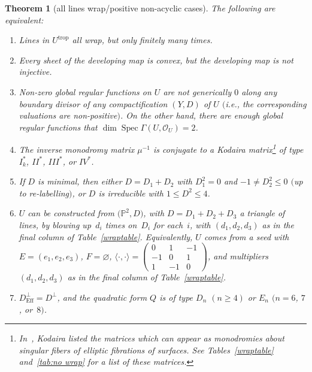 \documentclass[pdftex]{sigma}
\numberwithin{equation}{section}
\numberwithin{figure}{section}
\numberwithin{table}{section}
\DeclareMathOperator{\Spec}{Spec}
\DeclareMathOperator{\trop}{trop}
\DeclareMathOperator{\Eff}{Eff}
\let\bb=\mathbb
\let\s=\mathcal
\newtheorem{thm}{Theorem}[section]
\theoremstyle{definition}
\begin{document}
\begin{thm}[all lines wrap/positive non-acyclic cases]\label{all-wrap}
The following are equivalent:
\begin{enumerate}\itemsep=0pt	
 \item[$1.$] {Lines} in $U^{\trop}$ all wrap, but only finitely many times. %
 \item[$2.$] Every sheet of the {developing map} is convex, but the developing map is not injective. %
 \item[$3.$] Non-zero global regular {functions} on $U$ are not generically $0$ along any boundary divisor of any compactification $(Y,D)$ of $U$ $($i.e., the corresponding valuations are non-positive$)$. On the other hand, there are enough global regular functions that $\dim \Spec \Gamma(U,\s{O}_U)=2$.%
 \item[$4.$] The inverse {monodromy matrix} $\mu^{-1}$ is conjugate to a Kodaira matrix\footnote{In~\cite{Kod}, Kodaira listed the matrices which can appear as monodromies about singular fibers of elliptic fibrations of surfaces. See Tables~\ref{wraptable} and~\ref{tab:no wrap} for a list of these matrices.} of type $I_k^*$, $II^*$, $III^*$, or $IV^*$. %
 \item[$5.$] If $D$ is minimal, then either $D=D_1+D_2$ with $D_1^2 = 0$ and $-1\neq D_2^2 \leq 0$ $($up to re-labelling$)$, or $D$ is irreducible with $1\leq D^2 \leq 4$. 	%
 \item[$6.$] $U$ can be constructed from $\big(\bb{P}^2,D\big)$, with $D=D_1+D_2+D_3$ a triangle of lines, by blowing up~$d_i$ times on~$D_i$ for each~$i$, with $(d_1,d_2,d_3)$ as in the final column of Table~{\rm \ref{wraptable}}. Equivalently, $U$ comes from a seed with $E=(e_1,e_2,e_3)$, $F=\varnothing$, $\langle \cdot , \cdot \rangle = 	\left(\begin{smallmatrix}
		0 &1 &-1 \\
	 -1 &0 &1 \\
	 1 &-1 &0
		\end{smallmatrix}\right)$, and multipliers $(d_1,d_2,d_3)$ as in the final column of Table~{\rm \ref{wraptable}}.
\item[$7.$] $D^{\perp}_{\Eff}=D^{\perp}$, and the {quadratic form} $Q$ is of type $D_n$ $(n\geq 4)$ or $E_n$ $(n=6$, $7$, or~$8)$. %
\end{enumerate}
\end{thm}
\end{document}
